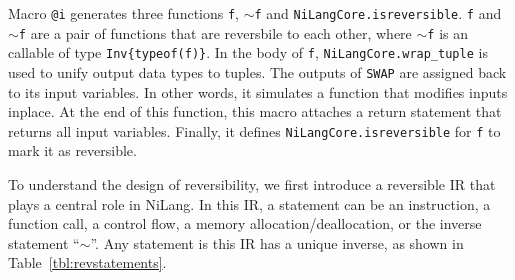 \documentclass[aps,twocolumn,longbibliography,english,superscriptaddress]{revtex4-1}
\newcommand{\<}{\langle}
\renewcommand{\>}{\rangle}
\newcommand{\Tbl}[1]{Table~\ref{#1}}
\theoremstyle{definition}\newtheorem{definition}{\textit{Definition}}
\begin{document}
Macro \texttt{@i} generates three functions \texttt{f}, \texttt{$\sim$f} and \texttt{NiLangCore.isreversible}. \texttt{f} and \texttt{$\sim$f} are a pair of functions that are reversbile to each other, where \texttt{$\sim$f} is an callable of type \texttt{Inv\{typeof(f)\}}.
In the body of \texttt{f}, \texttt{NiLangCore.wrap\_tuple} is used to unify output data types to tuples.
The outputs of \texttt{SWAP} are assigned back to its input variables. In other words, it simulates a function that modifies inputs inplace.
At the end of this function, this macro attaches a return statement that returns all input variables.
Finally, it defines \texttt{NiLangCore.isreversible} for \texttt{f} to mark it as reversible.

To understand the design of reversibility, we first introduce a reversible IR that plays a central role in NiLang.
In this IR, a statement can be an instruction, a function call, a control flow, a memory allocation/deallocation, or the inverse statement ``$\sim$''.
Any statement is this IR has a unique inverse, as shown in \Tbl{tbl:revstatements}.
\end{document}
